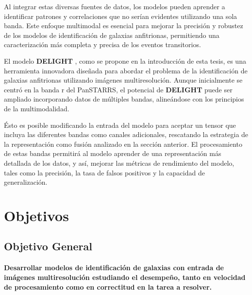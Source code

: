 \documentclass[../tesis.tex]{subfiles}
\begin{document}
Al integrar estas diversas fuentes de datos, los modelos pueden aprender a identificar patrones y correlaciones que no serían evidentes utilizando una sola banda. Este enfoque multimodal es esencial para mejorar la precisión y robustez de los modelos de identificación de galaxias anfitrionas, permitiendo una caracterización más completa y precisa de los eventos transitorios.\par\null\par

El modelo \textbf{DELIGHT} \cite{delight}, como se propone en la introducción de esta tesis, es una herramienta innovadora diseñada para abordar el problema de la identificación de galaxias anfitrionas utilizando imágenes multiresolución. Aunque inicialmente se centró en la banda r del PanSTARRS, el potencial de \textbf{DELIGHT} puede ser ampliado incorporando datos de múltiples bandas, alineándose con los principios de la multimodalidad.\par\null\par

Ésto es posible modificando la entrada del modelo para aceptar un tensor que incluya las diferentes bandas como canales adicionales, rescatando la estrategia de la representación como fusión analizado en la sección anterior. El procesamiento de estas bandas permitirá al modelo aprender de una representación más detallada de los datos, y así, mejorar las métricas de rendimiento del modelo, tales como la precisión, la tasa de falsos positivos y la capacidad de generalización. 

\newpage

\section{Objetivos} \label{introduction:objectives}
\subsection{Objetivo General}

\paragraph{Desarrollar modelos de identificación de galaxias con entrada de imágenes multiresolución estudiando el desempeño, tanto en velocidad de procesamiento como en correctitud en la tarea a resolver.}
\end{document}

